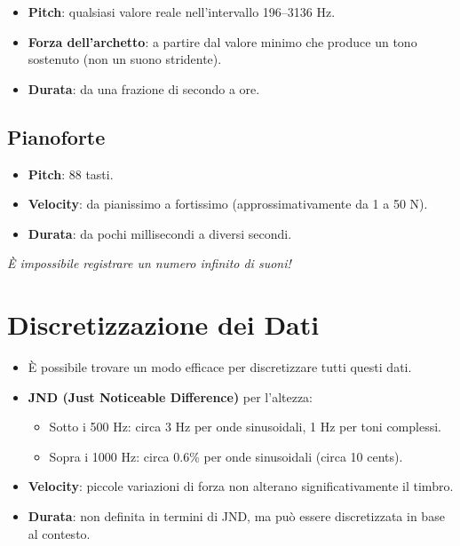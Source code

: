 \begin{itemize}
    \item \textbf{Pitch}: qualsiasi valore reale nell'intervallo 196--3136 Hz.
    \item \textbf{Forza dell'archetto}: a partire dal valore minimo che produce un tono sostenuto (non un suono stridente).
    \item \textbf{Durata}: da una frazione di secondo a ore.
\end{itemize}

\subsection{Pianoforte}

\begin{itemize}
    \item \textbf{Pitch}: 88 tasti.
    \item \textbf{Velocity}: da pianissimo a fortissimo (approssimativamente da 1 a 50 N).
    \item \textbf{Durata}: da pochi millisecondi a diversi secondi.
\end{itemize}

\noindent
\textit{È impossibile registrare un numero infinito di suoni!}

\section{Discretizzazione dei Dati}

\begin{itemize}
    \item È possibile trovare un modo efficace per discretizzare tutti questi dati.
    \item \textbf{JND (Just Noticeable Difference)} per l'altezza:
    \begin{itemize}
        \item Sotto i 500 Hz: circa 3 Hz per onde sinusoidali, 1 Hz per toni complessi.
        \item Sopra i 1000 Hz: circa 0.6\% per onde sinusoidali (circa 10 cents).
    \end{itemize}
    \item \textbf{Velocity}: piccole variazioni di forza non alterano significativamente il timbro.
    \item \textbf{Durata}: non definita in termini di JND, ma può essere discretizzata in base al contesto.
\end{itemize}


